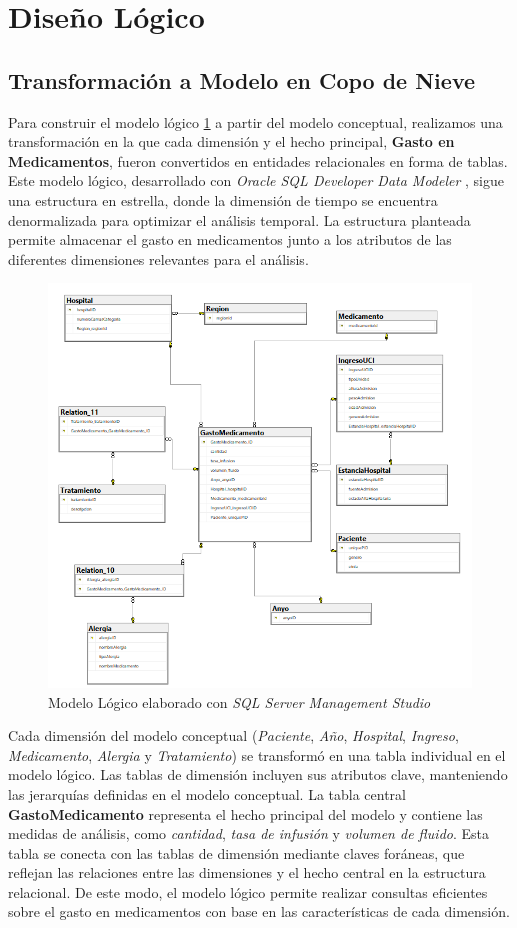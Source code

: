 \documentclass{article}
\begin{document}
\section{Diseño Lógico}
\label{sec:diseno_logico}
\subsection{Transformación a Modelo en Copo de Nieve}

Para construir el modelo lógico \ref{fig:logico}  a partir del modelo conceptual, realizamos una transformación en la que cada dimensión y el hecho principal, \textbf{Gasto en Medicamentos}, fueron convertidos en entidades relacionales en forma de tablas. Este modelo lógico, desarrollado con \textit{Oracle SQL Developer Data Modeler} \cite{oracle_datamodeler}, sigue una estructura en estrella, donde la dimensión de tiempo se encuentra denormalizada para optimizar el análisis temporal. La estructura planteada permite almacenar el gasto en medicamentos junto a los atributos de las diferentes dimensiones relevantes para el análisis. 


\begin{figure}[H]
	\centering
	\includegraphics[width=.7\textwidth]{images/diseño_logico.png}
	\caption{Modelo Lógico elaborado con \textit{SQL Server Management Studio} \cite{sqlserver_managementstudio}}
	\label{fig:logico}
\end{figure}
Cada dimensión del modelo conceptual (\textit{Paciente}, \textit{Año}, \textit{Hospital}, \textit{Ingreso}, \textit{Medicamento}, \textit{Alergia} y \textit{Tratamiento}) se transformó en una tabla individual en el modelo lógico. Las tablas de dimensión incluyen sus atributos clave, manteniendo las jerarquías definidas en el modelo conceptual. La tabla central \textbf{GastoMedicamento} representa el hecho principal del modelo y contiene las medidas de análisis, como \textit{cantidad}, \textit{tasa de infusión} y \textit{volumen de fluido}. Esta tabla se conecta con las tablas de dimensión mediante claves foráneas, que reflejan las relaciones entre las dimensiones y el hecho central en la estructura relacional. De este modo, el modelo lógico permite realizar consultas eficientes sobre el gasto en medicamentos con base en las características de cada dimensión.
\end{document}
